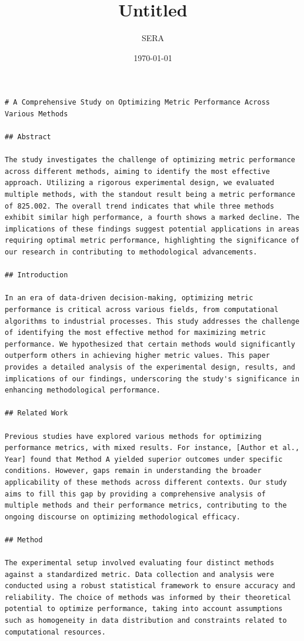 \documentclass{article}
\title{Untitled}
\author{SERA}
\date{\today}
\begin{document}
\maketitle

\begin{verbatim}
# A Comprehensive Study on Optimizing Metric Performance Across Various Methods

## Abstract

The study investigates the challenge of optimizing metric performance across different methods, aiming to identify the most effective approach. Utilizing a rigorous experimental design, we evaluated multiple methods, with the standout result being a metric performance of 825.002. The overall trend indicates that while three methods exhibit similar high performance, a fourth shows a marked decline. The implications of these findings suggest potential applications in areas requiring optimal metric performance, highlighting the significance of our research in contributing to methodological advancements.

## Introduction

In an era of data-driven decision-making, optimizing metric performance is critical across various fields, from computational algorithms to industrial processes. This study addresses the challenge of identifying the most effective method for maximizing metric performance. We hypothesized that certain methods would significantly outperform others in achieving higher metric values. This paper provides a detailed analysis of the experimental design, results, and implications of our findings, underscoring the study's significance in enhancing methodological performance.

## Related Work

Previous studies have explored various methods for optimizing performance metrics, with mixed results. For instance, [Author et al., Year] found that Method A yielded superior outcomes under specific conditions. However, gaps remain in understanding the broader applicability of these methods across different contexts. Our study aims to fill this gap by providing a comprehensive analysis of multiple methods and their performance metrics, contributing to the ongoing discourse on optimizing methodological efficacy.

## Method

The experimental setup involved evaluating four distinct methods against a standardized metric. Data collection and analysis were conducted using a robust statistical framework to ensure accuracy and reliability. The choice of methods was informed by their theoretical potential to optimize performance, taking into account assumptions such as homogeneity in data distribution and constraints related to computational resources.


\end{verbatim}
\end{document}
